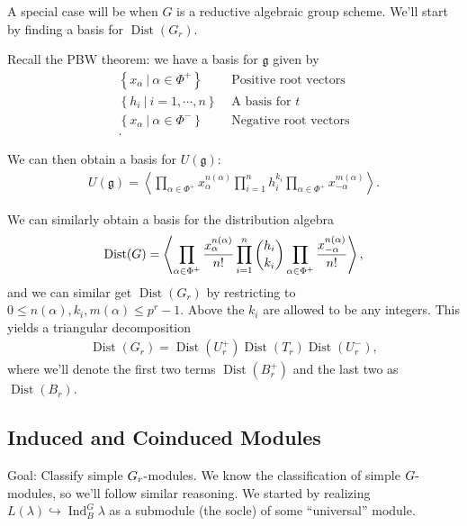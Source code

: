 A special case will be when \(G\) is a reductive algebraic group scheme.
We'll start by finding a basis for \(\operatorname{Dist}(G_r)\).

Recall the PBW theorem: we have a basis for \({\mathfrak{g}}\) given by
\begin{align*}  
\left\{{x_\alpha {~\mathrel{\Big|}~}\alpha\in \Phi^+ }\right\} &\text{ Positive root vectors} \\
\left\{{h_i {~\mathrel{\Big|}~}i=1,\cdots, n}\right\} &\text{ A basis for } t \\
\left\{{x_\alpha {~\mathrel{\Big|}~}\alpha\in \Phi^- }\right\} &\text{ Negative root vectors} \\
.\end{align*}

We can then obtain a basis for \(U({\mathfrak{g}})\):
\begin{align*}  
U({\mathfrak{g}}) = \left\langle{ \prod_{\alpha\in\Phi^+} x_\alpha^{n(\alpha)} \prod_{i=1}^n h_i^{k_i} \prod_{\alpha\in\Phi^+} x_{-\alpha}^{m(\alpha)}  }\right\rangle
.\end{align*}

We can similarly obtain a basis for the distribution algebra
\begin{align*}  
\operatorname{Dist}(G) = \left\langle{ 
\prod_{\alpha\in\Phi^+} { x_{\alpha}^{n(\alpha)} \over n!} 
\prod_{i=1}^n {h_i \choose k_i} 
\prod_{\alpha\in\Phi^+} { x_{-\alpha}^{n(\alpha)} \over n!} 
}\right\rangle
,\end{align*}
and we can similar get \(\operatorname{Dist}(G_r)\) by restricting to
\(0\leq n(\alpha), k_i, m(\alpha) \leq p^r - 1\). Above the \(k_i\) are
allowed to be any integers. This yields a triangular decomposition
\begin{align*}  
\operatorname{Dist}(G_r) = \operatorname{Dist}(U_r^+) \operatorname{Dist}(T_r) \operatorname{Dist}(U_r^-)
,\end{align*}
where we'll denote the first two terms \(\operatorname{Dist}(B_r^+)\)
and the last two as \(\operatorname{Dist}(B_r)\).

\hypertarget{induced-and-coinduced-modules}{%
\subsection{Induced and Coinduced
Modules}\label{induced-and-coinduced-modules}}

Goal: Classify simple \(G_r{\hbox{-}}\)modules. We know the
classification of simple \(G{\hbox{-}}\)modules, so we'll follow similar
reasoning. We started by realizing
\(L(\lambda) \hookrightarrow\operatorname{Ind}_B^G \lambda\) as a
submodule (the socle) of some ``universal'' module.

